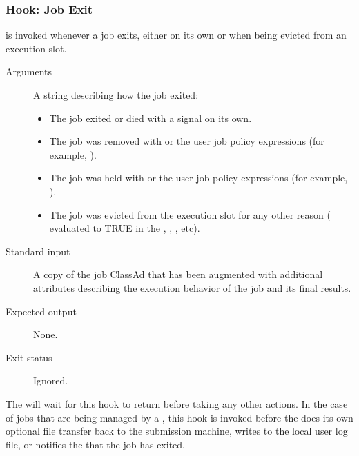 \subsubsection{\label{sec:job-hooks-job-exit}
Hook: Job Exit}

 is invoked whenever a job exits, either on its
own or when being evicted from an execution slot.

\begin{description}
\item[Arguments]
  A string describing how the job exited:
  \begin{itemize}
    \item \verb@exit@ The job exited or died with a signal on its own.
    \item \verb@remove@ The job was removed with  or the
    user job policy expressions (for example, ).
    \item \verb@hold@ The job was held with  or the
    user job policy expressions (for example, ).
    \item \verb@evict@ The job was evicted from the execution slot for
    any other reason ( evaluated to TRUE in the
    , , , etc).
  \end{itemize}

\item[Standard input]
  A copy of the job ClassAd that has been augmented with additional
  attributes describing the execution behavior of the job and its
  final results.

\item[Expected output]
  None.

\item[Exit status]
  Ignored.
\end{description}

The  will wait for this hook to return before
taking any other actions.
In the case of jobs that are being managed by a , this
hook is invoked before the  does its own optional file
transfer back to the submission machine, writes to the local user log
file, or notifies the  that the job has exited.

